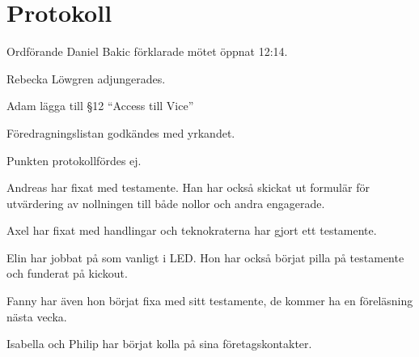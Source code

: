 \documentclass[10pt]{article}
\def\mo{Daniel Bakic}
\begin{document}
\section*{Protokoll}
\begin{paragrafer}
	Ordförande {\mo} förklarade mötet öppnat 12:14.

	{\valavmo}

	{\valavms}

	{\valavj}

	{\tosg}

	Rebecka Löwgren adjungerades.


	
	Adam \ypa lägga till \S12 ``Access till Vice''

	Föredragningslistan godkändes med yrkandet.


	\begin{fyllnadsval} %
	\end{fyllnadsval}

	\begin{paragrafer}
		Punkten protokollfördes ej.


		Andreas har fixat med testamente. Han har också skickat ut formulär för utvärdering av nollningen till både nollor och andra engagerade.

		Axel har fixat med handlingar och teknokraterna har gjort ett testamente.

		Elin har jobbat på som vanligt i LED. Hon har också börjat pilla på testamente och funderat på kickout. 

		Fanny har även hon börjat fixa med sitt testamente, de kommer ha en föreläsning nästa vecka.

		Isabella och Philip har börjat kolla på sina företagskontakter.


\end{paragrafer}
\end{paragrafer}
\end{document}
